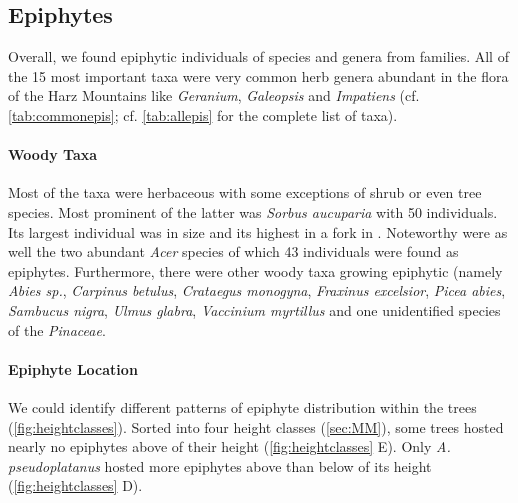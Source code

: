 \documentclass[12pt, a4paper, oneside, draft]{article}
\begin{document}
	
	\subsection{Epiphytes}  
	 Overall, we found epiphytic individuals of  species and  genera from  families. All of the 15 most important taxa were very common herb genera abundant in the flora of the Harz Mountains like \textit{Geranium}, \textit{Galeopsis} and \textit{Impatiens} (cf. \autoref{tab:commonepis}; cf. \autoref{tab:allepis} for the complete list of taxa). 

		\paragraph{Woody Taxa} Most of the taxa were herbaceous with some exceptions of shrub or even tree species. Most prominent of the latter was \textit{Sorbus aucuparia} with 50 individuals. Its largest individual was  in size and its highest in a fork in . Noteworthy were as well the two abundant \textit{Acer} species of which 43 individuals were found as epiphytes. Furthermore, there were  other woody taxa growing epiphytic (namely \textit{Abies sp.}, \textit{Carpinus betulus}, \textit{Crataegus monogyna}, \textit{Fraxinus excelsior}, \textit{Picea abies}, \textit{Sambucus nigra}, \textit{Ulmus glabra}, \textit{Vaccinium myrtillus} and one unidentified species of the \textit{Pinaceae}.
		
		
	
	
		\paragraph{Epiphyte Location}
		We could identify different patterns of epiphyte distribution within the trees (\ref{fig:heightclasses}). Sorted into four height classes (\autoref{sec:MM}), some trees hosted nearly no epiphytes above  of their height (\autoref{fig:heightclasses} E). Only \textit{A. pseudoplatanus} hosted more epiphytes above than below  of its height (\autoref{fig:heightclasses} D).
		
		
	
\end{document}
